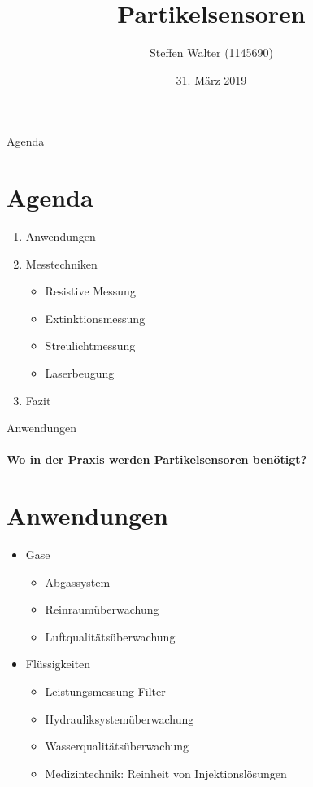 \documentclass{beamer}
\title{Partikelsensoren}
\author{Steffen Walter (1145690)}
\institute{Duale Hochschule Baden-Württemberg -- Stuttgart\newline Vorlesung: Sensorik und Aktorik}
\date{31. März 2019}
\begin{document}
	\maketitle
	\begin{frame}{Agenda}
		\section{Agenda}
		\begin{enumerate}
			\item Anwendungen
			\item Messtechniken
			\begin{itemize}
				\item Resistive Messung
				\item Extinktionsmessung
				\item Streulichtmessung
				\item Laserbeugung
			\end{itemize}
			\item Fazit
		\end{enumerate}
	\end{frame}

	
	\begin{frame}{Anwendungen}
	\framesubtitle{Wo in der Praxis werden Partikelsensoren benötigt?}
	\section{Anwendungen}
	\begin{itemize}
		\item Gase
		\begin{itemize}
			\item Abgassystem
			\item Reinraumüberwachung
			\item Luftqualitätsüberwachung
		\end{itemize}
		\item Flüssigkeiten
		\begin{itemize}
			\item Leistungsmessung Filter
			\item Hydrauliksystemüberwachung
			\item Wasserqualitätsüberwachung
			\item Medizintechnik: Reinheit von Injektionslösungen
		\end{itemize}
	\end{itemize}
	\end{frame}
\end{document}
